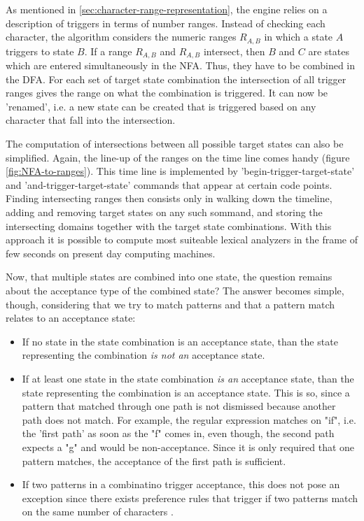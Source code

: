 As mentioned in \ref{sec:character-range-representation}, the {\quex} engine
relies on a description of triggers in terms of number ranges.  Instead of
checking each character, the algorithm considers the numeric ranges $R_{A,B}$
in which a state $A$ triggers to state $B$. If a range $R_{A,B}$ and $R_{A,B}$
intersect, then $B$ and $C$ are states which are entered simultaneously in the
NFA. Thus, they have to be combined in the DFA. For each set of target state
combination the intersection of all trigger ranges gives the range on what the
combination is triggered. It can now be 'renamed', i.e.  a new state can be
created that is triggered based on any character that fall into the
intersection. 

The computation of intersections between all possible target states can also be
simplified.  Again, the line-up of the ranges on the time line comes handy
(figure \ref{fig:NFA-to-ranges}).  This time line is
implemented by 'begin-trigger-target-state' and 'and-trigger-target-state'
commands that appear at certain code points. Finding intersecting ranges then
consists only in walking down the timeline, adding and removing target states
on any such sommand, and storing the intersecting domains together with the
target state combinations. With this approach it is possible to compute
most suiteable lexical analyzers in the frame of few seconds on present day
computing machines.

Now, that multiple states are combined into one state, the question remains about the
acceptance type of the combined state? The answer becomes simple, though, considering that we try to
match patterns and that a pattern match relates to an acceptance state:

\begin{itemize}
\item If no state in the state combination is an acceptance state, than the 
      state representing the combination {\it is not an} acceptance state.
\item If at least one state in the state combination {\it is an} acceptance state, than 
      the state representing the combination is an acceptance state. This is 
      so, since a pattern that matched through one path is not dismissed
      because another path does not match. For example, the regular
      expression  matches on "if", i.e. the 'first path'
      as soon as the "f" comes in, even though, the second path expects a "g" and
      would be non-acceptance. 
      Since it is only required that one pattern matches, the acceptance 
      of the first path is sufficient. 
\item If two patterns in a combinatino trigger acceptance, this does not pose
      an exception since there exists preference rules that trigger if two
      patterns match on the same number of characters \myref{}.
\end{itemize}

